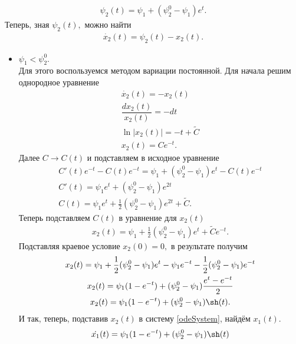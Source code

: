 \documentclass[11pt]{article}
\begin{document}
\begin{enumerate}
   		\begin{gather*}
			\psi_2(t) = \psi_1 + (\psi_2^0 - \psi_1) e^t.   			
   		\end{gather*}
   		Теперь, зная $ \psi_2(t), $ можно найти
   		\begin{gather*}
			\dot{x_2}(t) = \psi_2(t) - x_2(t).   			
   		\end{gather*}
   		\begin{itemize}
   			\item $ \psi_1 < \psi_2^0. $ \\ 
   			Для этого воспользуемся методом вариации постоянной. Для начала решим однородное уравнение
   			\begin{gather*}
				\dot{x_2}(t) = - x_2(t) \\
				\dfrac{d x_2(t)}{x_2(t)} = -dt \\
   				\ln \vert x_2(t) \vert = -t + \tilde{C} \\
   				x_2(t) = C e^{-t}.  			
   			\end{gather*}
   			Далее $ C \rightarrow C(t) $ и подставляем в исходное уравнение
   			\begin{gather*}
				C'(t) e^{-t} - C(t) e^{-t} = \psi_1 + (\psi_2^0 - \psi_1) e^t - C(t) e^{-t} \\
				C'(t) = \psi_1 e^t + (\psi_2^0 - \psi_1) e^{2t} \\
				C(t) = \psi_1 e^t + \frac{1}{2}(\psi_2^0 - \psi_1) e^{2t} + \tilde{C}.			  		
   			\end{gather*}
   			Теперь подставляем $ C(t) $ в уравнение для $ x_2(t) $
   			\begin{gather*}
				x_2(t) = \psi_1 + \frac{1}{2}(\psi_2^0 - \psi_1) e^{t} + \tilde{C} e^{-t}.   			
   			\end{gather*}
   			Подставляя краевое условие $ x_2(0) = 0, $ в результате получим
   			\begin{gather*}
				x_2(t) = \psi_1 + \frac{1}{2}(\psi_2^0 - \psi_1) e^t - \psi_1 e^{-t} - \frac{1}{2}(\psi_2^0 - \psi_1) e^{-t} \\
				x_2(t) = \psi_1(1 - e^{-t}) + (\psi_2^0 - \psi_1) \frac{e^t - e^{-t}}{2} \\
				x_2(t) = \psi_1(1 - e^{-t}) + (\psi_2^0 - \psi_1) \sh(t).
   			\end{gather*}
   			И так, теперь, подставив $ x_2(t) $ в систему \eqref{odeSystem}, найдём $ x_1(t). $
   			\begin{gather*}
				\dot{x_1}(t) = \psi_1(1 - e^{-t}) + (\psi_2^0 - \psi_1) \sh(t) \\

\end{gather*}
\end{itemize}
\end{enumerate}
\end{document}
